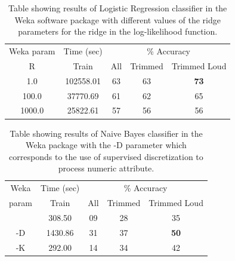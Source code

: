 \documentclass[12pt,oneside]{book}
\begin{document}
\begin{table}
\begin{tabular}{|c|c|c|c|c|}
\hline
\multicolumn{1}{|c|}{Weka param} & \multicolumn{1}{c|}{Time (sec)} & \multicolumn{3}{c|}{\% Accuracy} \\
\hhline{|-|-|-|-|-|}
R & Train & All & Trimmed & Trimmed Loud \\
\hhline{|=|=|=|=|=|}
1.0      &    102558.01  &    63 & 63 & \textbf{73} \\
100.0    &     37770.69  &    61 & 62 & 65 \\
1000.0   &     25822.61  &    57 & 56 & 56 \\
\hline
\end{tabular}
\caption{Table showing results of Logistic
  Regression classifier in the Weka software package with different
  values of the ridge parameters for the ridge in the log-likelihood
  function.}
\label{table:calls-weka-logistic}
\end{table}


\begin{table}
\begin{tabular}{|c|c|c|c|c|}
\hline
\multicolumn{1}{|c|}{Weka} & \multicolumn{1}{c|}{Time (sec)} & \multicolumn{3}{c|}{\% Accuracy} \\
\hhline{|-|-|-|-|-|}
param & Train & All & Trimmed & Trimmed Loud \\
\hhline{|=|=|=|=|=|}
     &    308.50  &  09 & 28 & 35 \\
 -D  &   1430.86  &  31 & 37 & \textbf{50} \\
 -K  &    292.00  &  14 & 34 & 42 \\
\hline
\end{tabular}
\caption{Table showing results of Naive Bayes
  classifier in the Weka package with the -D parameter which
  corresponds to the use of supervised discretization to process
  numeric attribute.}
\label{table:calls-weka-naiveBayes}
\end{table}
\end{document}
